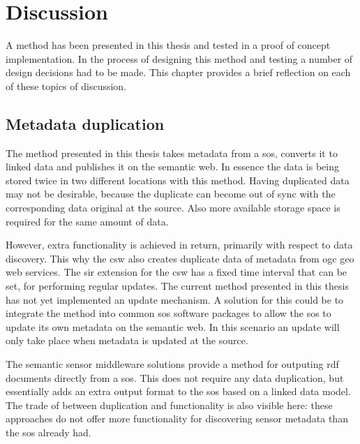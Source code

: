 
\chapter{Discussion}
\label{chap:disc}

A method has been presented in this thesis and tested in a proof of concept implementation. In the process of designing this method and testing a number of design decisions had to be made. This chapter provides a brief reflection on each of these topics of discussion.

\section*{Metadata duplication}
The method presented in this thesis takes metadata from a \ac{sos}, converts it to linked data and publishes it on the semantic web. In essence the data is being stored twice in two different locations with this method. Having duplicated data  may not be desirable, because the duplicate can become out of sync with the corresponding data original at the source. Also more available storage space is required for the same amount of data. 

However, extra functionality is achieved in return, primarily with respect to data discovery. This why the \ac{csw} also creates duplicate data of metadata from \ac{ogc} geo web services. The \ac{sir} extension for the \ac{csw} has a fixed time interval that can be set, for performing regular updates. The current method presented in this thesis has not yet implemented an update mechanism. A solution for this could be to integrate the method into common \ac{sos} software packages to allow the \ac{sos} to update its own metadata on the semantic web. In this scenario an update will only take place when metadata is updated at the source.

The semantic sensor middleware solutions provide a method for outputing \ac{rdf} documents directly from a \ac{sos}. This does not require any data duplication, but essentially adds an extra output format to the \ac{sos} based on a linked data model. The trade of between duplication and functionality is also visible here: these approaches do not offer more functionality for discovering sensor metadata than the \ac{sos} already had.       

